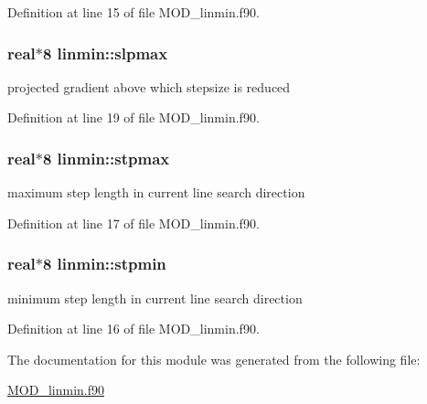 Definition at line 15 of file M\-O\-D\-\_\-linmin.\-f90.

\hypertarget{classlinmin_af2ae0469bbfd98f76cbb8aaa36b1f10b}{
\subsubsection[{slpmax}]{\setlength{\rightskip}{0pt plus 5cm}real$\ast$8 linmin\-::slpmax}}\label{classlinmin_af2ae0469bbfd98f76cbb8aaa36b1f10b}


projected gradient above which stepsize is reduced 



Definition at line 19 of file M\-O\-D\-\_\-linmin.\-f90.

\hypertarget{classlinmin_a3d008c29592b9129fdae235012cf9b9c}{
\subsubsection[{stpmax}]{\setlength{\rightskip}{0pt plus 5cm}real$\ast$8 linmin\-::stpmax}}\label{classlinmin_a3d008c29592b9129fdae235012cf9b9c}


maximum step length in current line search direction 



Definition at line 17 of file M\-O\-D\-\_\-linmin.\-f90.

\hypertarget{classlinmin_af604d0ec9d1f8fa40766c12d95b311dd}{
\subsubsection[{stpmin}]{\setlength{\rightskip}{0pt plus 5cm}real$\ast$8 linmin\-::stpmin}}\label{classlinmin_af604d0ec9d1f8fa40766c12d95b311dd}


minimum step length in current line search direction 



Definition at line 16 of file M\-O\-D\-\_\-linmin.\-f90.



The documentation for this module was generated from the following file\-:\begin{DoxyCompactItemize}
\item 
\hyperlink{MOD__linmin_8f90}{M\-O\-D\-\_\-linmin.\-f90}\end{DoxyCompactItemize}
